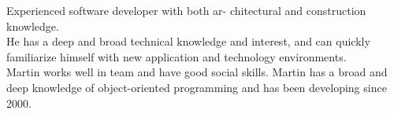 \documentclass[9pt]{template} %
\begin{document}
\vspace{0.5cm}



\begin{minipage}[t]{0.4\textwidth} %
  \vspace{-\baselineskip} %
  Experienced software developer with both ar- chitectural and construction knowledge.\\

  He has a deep and broad technical knowledge and interest, and can quickly familiarize himself with new application and technology environments.\\

  Martin works well in team and have good social skills. Martin has a broad and deep knowledge of object-oriented programming and has been developing since 2000.
\end{minipage}
\hfill %
\begin{minipage}[t]{0.5\textwidth} %
  \vspace{-\baselineskip} %
  \begin{barchart}{5.0}
  \end{barchart}
\end{minipage}



\end{document}
